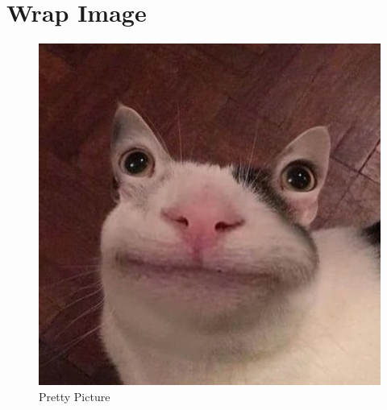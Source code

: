 \documentclass[a4paper,12pt]{book}
\begin{document}
\newpage
 
\section*{Wrap Image}
 
 
\begingroup
 
 
\setlength{\intextsep}{0pt}
 
 
\setlength{\columnsep}{15pt}
 
 
 
 
 
\begin{figure}
\centering
 
  \includegraphics[width=\linewidth]{pic.jpg}
  \caption{Pretty Picture}\label{fig:prettypic}
\end{figure}
 
\end{document}
